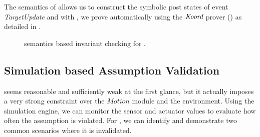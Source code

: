 The \K semantics of \lgname allows us to construct the symbolic post states of event \emph{TargetUpdate} and with , we prove  automatically using the $\emph{Koord}$ prover () as detailed in .

\begin{figure}
\caption{\K semantics based invariant checking for \lgname.}
\label{fig:tools}
\end{figure}

\subsection{Simulation based Assumption Validation}

 seems reasonable and sufficiently weak at the first glance,
but it actually imposes a very strong constraint over the $Motion$ module and the environment.
Using the simulation engine, we can monitor the sensor and actuator values to evaluate how often the assumption is violated.
For , we can identify and demonstrate two common scenarios
where it is invalidated.

